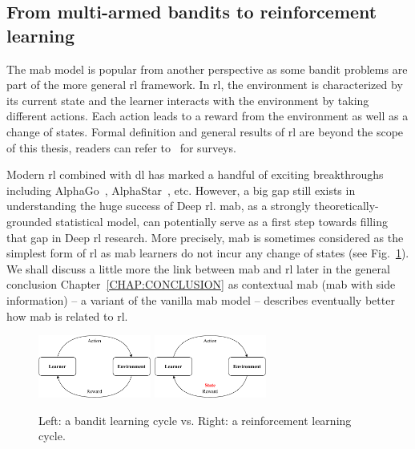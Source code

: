 \subsection{From multi-armed bandits to reinforcement learning}\label{sec:intro.context.rl}

The \gls{mab} model is popular from another perspective as some bandit problems are part of the more general \gls{rl} framework. In \gls{rl}, the environment is characterized by its current state and the learner interacts with the environment by taking different actions. Each action leads to a reward from the environment as well as a change of states. Formal definition and general results of \gls{rl} are beyond the scope of this thesis, readers can refer to~\cite{sutton1998,bertsekas2011approximate} for surveys. 

Modern \gls{rl} combined with \gls{dl} has marked a handful of exciting breakthroughs including AlphaGo~\citep{silver2016alphago}, AlphaStar~\citep{vinyals2019alphastar}, etc. However, a big gap still exists in understanding the huge success of Deep \gls{rl}. \gls{mab}, as a strongly theoretically-grounded statistical model, can potentially serve as a first step towards filling that gap in Deep \gls{rl} research. More precisely, \gls{mab} is sometimes considered as the simplest form of \gls{rl} as \gls{mab} learners do not incur any change of states (see Fig.~\ref{fig:intro.comparison}). We shall discuss a little more the link between \gls{mab} and \gls{rl} later in the general conclusion Chapter~\ref{CHAP:CONCLUSION} as contextual \gls{mab} (\gls{mab} with side information) -- a variant of the vanilla \gls{mab} model -- describes eventually better how \gls{mab} is related to \gls{rl}.

\begin{figure}[ht]
    \centering
    \includegraphics[width=0.33\textwidth]{Chapter1/img/mab.pdf}
    \includegraphics[width=0.33\textwidth]{Chapter1/img/rl.pdf}
    \caption{Left: a bandit learning cycle vs. Right: a reinforcement learning cycle.}
    \label{fig:intro.comparison}
\end{figure}

